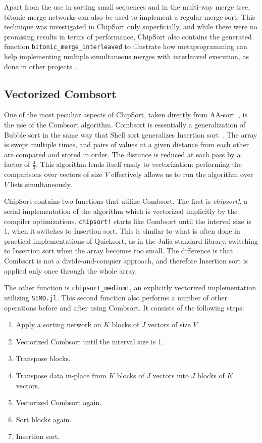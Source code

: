 \documentclass{juliacon}
\begin{document}
Apart from the use in sorting small sequences and in the multi-way merge tree, bitonic merge networks can also be used to implement a regular merge sort. This technique was investigated in ChipSort only superficially, and while there were no promising results in terms of performance, ChipSort also contains the generated function {\tt bitonic\_merge\_interleaved} to illustrate how metaprogramming can help implementing multiple simultaneous merges with interleaved execution, as done in other projects~\cite{DBLP:journals/pvldb/ChhuganiNLMHCBKD08}.

\subsection{Vectorized Combsort}
%
One of the most peculiar aspects of ChipSort, taken directly from AA-sort~\cite{DBLP:conf/IEEEpact/InoueMKN07,DBLP:journals/pvldb/InoueT15}, is the use of the Combsort algorithm. Combsort is essentially a generalization of Bubble sort in the same way that Shell sort generalizes Insertion sort~\cite{dobosiewicz1980efficient,Lacey:1991:FES:117187.117218,DBLP:books/lib/Knuth98a,DBLP:books/daglib/0023376}. The array is swept multiple times, and pairs of values at a given distance from each other are compared and stored in order. The distance is reduced at each pass by a factor of $\frac{4}{3}$. This algorithm lends itself easily to vectorization: performing the comparisons over vectors of size $V$ effectively allows us to run the algorithm over $V$ lists simultaneously.

ChipSort contains two functions that utilize Combsort. The first is {\em chipsort!}, a serial implementation of the algorithm which is vectorized implicitly by the compiler optimizations. {\tt chipsort!} starts like Combsort until the interval size is 1, when it switches to Insertion sort. This is similar to what is often done in practical implementations of Quicksort, as in the Julia standard library, switching to Insertion sort when the array becomes too small. The difference is that Combsort is not a divide-and-conquer approach, and therefore Insertion sort is applied only once through the whole array.

The other function is {\tt chipsort\_medium!}, an explicitly vectorized implementation utilizing {\tt SIMD.jl}. This second function also performs a number of other operations before and after using Combsort. It consists of the following steps:
\begin{enumerate}
\item Apply a sorting network on $K$ blocks of $J$ vectors of size $V$.
\item Vectorized Combsort until the interval size is 1.
\item Transpose blocks.
\item Transpose data in-place from $K$ blocks of $J$ vectors into $J$ blocks of $K$ vectors.
\item Vectorized Combsort again.
\item Sort blocks again.
\item Insertion sort.
\end{enumerate}
\end{document}
